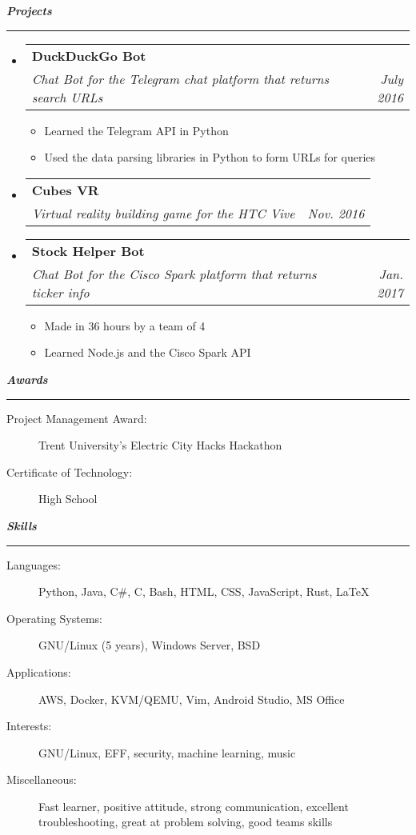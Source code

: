 \documentclass[letterpaper,11pt]{article}
\makeatletter
\newcommand{\resitem}[1]{\item #1 \vspace{-2pt}}
\newcommand{\mysection}[1]{\vspace{5pt} {\bfseries \textsl{#1}} \\ {\color{gray} \rule[5pt]{\textwidth}{1pt}}}
\newcommand{\ressubheading}[4]{\begin{tabular*}{6.5in}{l@{\extracolsep{\fill}}r}
		\textbf{#1} & #2 \\
		\textit{#3} & \textit{#4} \\
\end{tabular*}\vspace{-6pt}}
\makeatother
\begin{document}
\mysection{Projects}
\begin{itemize}
\item
	\ressubheading{DuckDuckGo Bot}{}{Chat Bot for the Telegram chat platform that returns search URLs}{July 2016}
	\begin{itemize}
		\resitem{Learned the Telegram API in Python}
		\resitem{Used the data parsing libraries in Python to form URLs for queries}
	\end{itemize}

\item
\ressubheading{Cubes VR}{}{Virtual reality building game for the HTC Vive}{Nov. 2016}

\item
	\ressubheading{Stock Helper Bot}{}{Chat Bot for the Cisco Spark platform that returns ticker info}{Jan. 2017}
	\begin{itemize}
		\resitem{Made in 36 hours by a team of 4}
		\resitem{Learned Node.js and the Cisco Spark API}
	\end{itemize}
\end{itemize}

\mysection{Awards}
\begin{description}
	\item[Project Management Award:]
	Trent University's Electric City Hacks Hackathon
	\item[Certificate of Technology:] High School
\end{description}

\mysection{Skills}
\begin{description}
\item[Languages:]
Python, Java, C\#, C, Bash, HTML, CSS, JavaScript, Rust, \LaTeX{}
\item[Operating Systems:]
GNU/Linux (5 years), Windows Server, BSD
\item[Applications:]
AWS, Docker, KVM/QEMU, Vim, Android Studio, MS Office
\item[Interests:]
GNU/Linux, EFF, security, machine learning, music
\item[Miscellaneous:]
Fast learner, positive attitude, strong communication, excellent troubleshooting, great at problem solving, good teams skills
\end{description}
\end{document}
